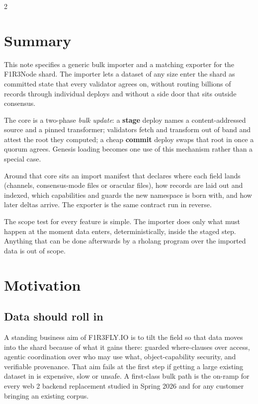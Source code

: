 \documentclass[10pt]{article}
\begin{document}
\begin{multicols}{2}

\section{Summary}

This note specifies a generic bulk importer and a matching exporter for the
F1R3Node shard. The importer lets a dataset of any size enter the shard as
committed state that every validator agrees on, without routing billions of
records through individual deploys and without a side door that sits outside
consensus.

The core is a two-phase \emph{bulk update}: a \textbf{stage} deploy names a
content-addressed source and a pinned transformer; validators fetch and
transform out of band and attest the root they computed; a cheap \textbf{commit}
deploy swaps that root in once a quorum agrees. Genesis loading becomes one use
of this mechanism rather than a special case.

Around that core sits an import manifest that declares where each field lands
(channels, consensus-mode files or oracular files), how records are laid out and
indexed, which capabilities and guards the new namespace is born with, and how
later deltas arrive. The exporter is the same contract run in reverse.

The scope test for every feature is simple. The importer does only what must
happen at the moment data enters, deterministically, inside the staged step.
Anything that can be done afterwards by a rholang program over the imported data
is out of scope.

\section{Motivation}

\subsection{Data should roll in}

A standing business aim of F1R3FLY.IO is to tilt the field so that data moves
into the shard because of what it gains there: guarded where-clauses over access,
agentic coordination over who may use what, object-capability security, and
verifiable provenance. That aim fails at the first step if getting a large
existing dataset in is expensive, slow or unsafe. A first-class bulk path is the
on-ramp for every web 2 backend replacement studied in Spring 2026 and for any
customer bringing an existing corpus.


\end{multicols}
\end{document}
